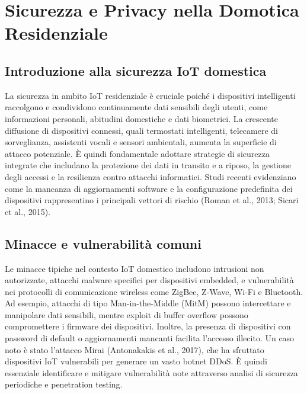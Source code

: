 \chapter{Sicurezza e Privacy nella Domotica Residenziale}

\section{Introduzione alla sicurezza IoT domestica}
La sicurezza in ambito IoT residenziale è cruciale poiché i dispositivi intelligenti raccolgono e condividono continuamente dati sensibili degli utenti, come informazioni personali, abitudini domestiche e dati biometrici. La crescente diffusione di dispositivi connessi, quali termostati intelligenti, telecamere di sorveglianza, assistenti vocali e sensori ambientali, aumenta la superficie di attacco potenziale. È quindi fondamentale adottare strategie di sicurezza integrate che includano la protezione dei dati in transito e a riposo, la gestione degli accessi e la resilienza contro attacchi informatici. Studi recenti evidenziano come la mancanza di aggiornamenti software e la configurazione predefinita dei dispositivi rappresentino i principali vettori di rischio (Roman et al., 2013; Sicari et al., 2015).

\section{Minacce e vulnerabilità comuni}
Le minacce tipiche nel contesto IoT domestico includono intrusioni non autorizzate, attacchi malware specifici per dispositivi embedded, e vulnerabilità nei protocolli di comunicazione wireless come ZigBee, Z-Wave, Wi-Fi e Bluetooth. Ad esempio, attacchi di tipo Man-in-the-Middle (MitM) possono intercettare e manipolare dati sensibili, mentre exploit di buffer overflow possono compromettere i firmware dei dispositivi. Inoltre, la presenza di dispositivi con password di default o aggiornamenti mancanti facilita l'accesso illecito. Un caso noto è stato l'attacco Mirai (Antonakakis et al., 2017), che ha sfruttato dispositivi IoT vulnerabili per generare un vasto botnet DDoS. È quindi essenziale identificare e mitigare vulnerabilità note attraverso analisi di sicurezza periodiche e penetration testing.

